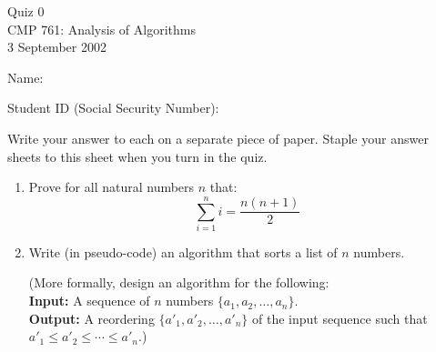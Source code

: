 \documentclass[11pt]{article}
\begin{document}
\begin{center}
	{Quiz 0}\\
	{CMP 761: Analysis of Algorithms}\\
	{3 September 2002}
\end{center}



Name: \underline{\hspace{ 3 in}}

Student ID (Social Security Number): \underline{\hspace{1in}}

\bigskip
Write your answer to each on a separate piece of paper.  Staple your
answer sheets to this sheet when you turn in the quiz.
\bigskip
\begin{enumerate}
  \item Prove for all natural numbers $n$ that:
	\[
		\sum_{i=1}^{n} i = \frac{n(n+1)}{2}
	\]
\bigskip	
  \item Write (in pseudo-code) an algorithm that sorts a list of $n$
	numbers.
	
	\bigskip
	(More formally, design an algorithm for the following:\\
	{\bf Input:} A sequence of $n$ numbers $\{a_1,a_2,\ldots,a_n\}$.\\
	{\bf Output:} A reordering $\{a'_1,a'_2,\ldots,a'_n\}$
		of the input sequence such that
		$a'_1 \leq a'_2 \leq \cdots \leq a'_n$.)
\end{enumerate}


 
\end{document}
